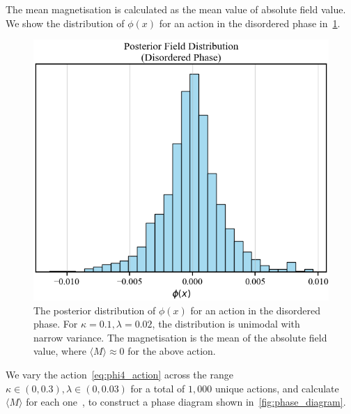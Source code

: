 \documentclass[11pt]{article}
\begin{document}
    The mean magnetisation is calculated as the mean value of absolute field value.
    We show the distribution of $\phi(x)$ for an action in the disordered phase in~\cref{fig:magnetisation}.
\begin{figure}[h!]
    \center
    \includegraphics[width=\linewidth]{../figures/Magnetisation}
    \caption{
        The posterior distribution of $\phi(x)$ for an action in the disordered phase.
        For $\kappa = 0.1, \lambda = 0.02$, the distribution is unimodal with narrow variance.
        The magnetisation is the mean of the absolute field value, where $\langle M \rangle \approx 0$ for the above action.
    }\label{fig:magnetisation}
    \end{figure}

    We vary the action~\eqref{eq:phi4_action} across the range $\kappa \in (0, 0.3), \lambda \in (0, 0.03)$ for
    a total of $1,000$ unique actions, and calculate $\langle M \rangle$ for each one~\cite{anesthetic}, to construct a phase diagram
    shown in~\cref{fig:phase_diagram}.
\end{document}
